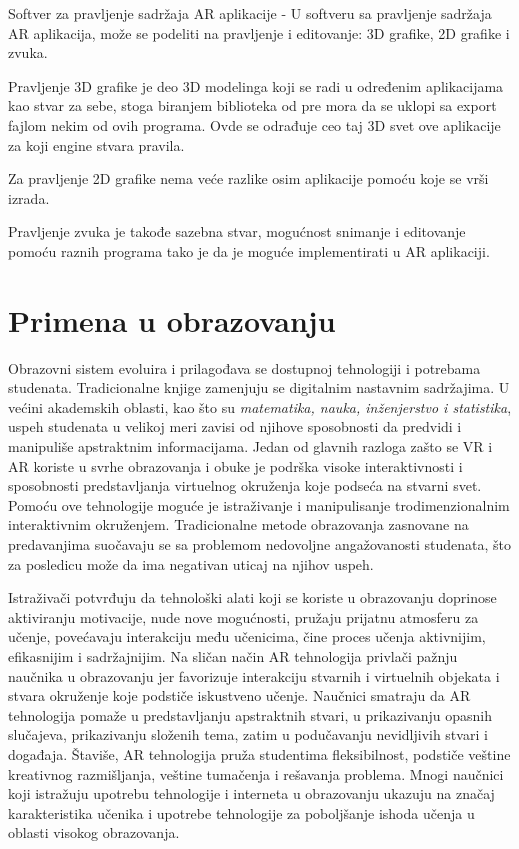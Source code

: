 \documentclass[a4paper]{article}
\begin{document}
	Softver za pravljenje sadržaja AR aplikacije - U softveru sa pravljenje sadržaja AR aplikacija, može se podeliti na pravljenje i editovanje: 3D grafike, 2D 
	grafike i zvuka.

	Pravljenje 3D grafike je deo 3D modelinga koji se radi u određenim aplikacijama kao stvar za sebe, stoga biranjem biblioteka od pre mora da se uklopi sa export 
	fajlom nekim od ovih programa. Ovde se odrađuje ceo taj 3D svet ove aplikacije za koji engine stvara pravila.

	Za pravljenje 2D grafike nema veće razlike osim aplikacije pomoću koje se vrši izrada.

	Pravljenje zvuka je takođe sazebna stvar, mogućnost snimanje i editovanje pomoću raznih programa tako je da je moguće implementirati u AR aplikaciji.

	\section{Primena u obrazovanju}
	\label{sec:Primena u obrazovanju}
	Obrazovni sistem evoluira i prilagođava se dostupnoj tehnologiji i potrebama studenata. Tradicionalne knjige zamenjuju se digitalnim nastavnim sadržajima. 
	U većini akademskih oblasti, kao što su \emph{matematika, nauka, inženjerstvo i statistika}, uspeh studenata u velikoj meri zavisi od njihove sposobnosti da 
	predvidi i manipuliše apstraktnim informacijama. Jedan od glavnih razloga zašto se VR i AR koriste u svrhe obrazovanja i obuke je podrška visoke interaktivnosti 
	i sposobnosti predstavljanja virtuelnog okruženja koje podseća na stvarni svet. Pomoću ove tehnologije moguće je istraživanje i manipulisanje trodimenzionalnim 
	interaktivnim okruženjem. Tradicionalne metode obrazovanja zasnovane na predavanjima suočavaju se sa problemom nedovoljne  angažovanosti studenata, što za posledicu 
	može da ima negativan uticaj na njihov uspeh.


	Istraživači potvrđuju da tehnološki alati koji se koriste u obrazovanju doprinose aktiviranju motivacije, nude nove mogućnosti, pružaju prijatnu atmosferu za učenje, 
	povećavaju interakciju među učenicima, čine proces učenja aktivnijim, efikasnijim i sadržajnijim. Na sličan način AR tehnologija privlači pažnju naučnika u obrazovanju 
	jer favorizuje interakciju stvarnih i virtuelnih objekata i stvara okruženje koje podstiče iskustveno učenje. Naučnici smatraju da AR tehnologija pomaže u predstavljanju 
	apstraktnih stvari, u prikazivanju opasnih slučajeva, prikazivanju složenih tema, zatim u podučavanju nevidljivih stvari i događaja. Štaviše, AR tehnologija pruža studentima 
	fleksibilnost, podstiče veštine kreativnog razmišljanja, veštine tumačenja i rešavanja problema. Mnogi naučnici koji istražuju upotrebu tehnologije i interneta u obrazovanju 
	ukazuju na značaj karakteristika učenika i upotrebe tehnologije za poboljšanje ishoda učenja u oblasti visokog obrazovanja. \cite{Primena AR tehnologije obrazovanju 1}
\end{document}
